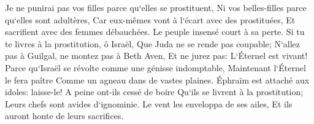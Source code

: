 \verse Je ne punirai pas vos filles parce qu`elles se prostituent, Ni vos belles-filles parce qu`elles sont adultères, Car eux-mêmes vont à l`écart avec des prostituées, Et sacrifient avec des femmes débauchées. Le peuple insensé court à sa perte. 
\verse Si tu te livres à la prostitution, ô Israël, Que Juda ne se rende pas coupable; N`allez pas à Guilgal, ne montez pas à Beth Aven, Et ne jurez pas: L`Éternel est vivant! 
\verse Parce qu`Israël se révolte comme une génisse indomptable, Maintenant l`Éternel le fera paître Comme un agneau dans de vastes plaines. 
\verse Éphraïm est attaché aux idoles: laisse-le! 
\verse A peine ont-ils cessé de boire Qu`ils se livrent à la prostitution; Leurs chefs sont avides d`ignominie. 
\verse Le vent les enveloppa de ses ailes, Et ils auront honte de leurs sacrifices. 


